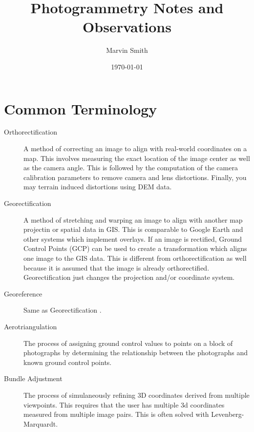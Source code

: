 \documentclass[12pt]{report}
\title{Photogrammetry Notes and Observations}
\author{Marvin Smith}
\date{\today}
\begin{document}
\maketitle

\tableofcontents
\clearpage

\section*{Common Terminology}

\begin{description}
\item[Orthorectification] A method of correcting an image to align with real-world coordinates on a map. 
                          This involves measuring the exact location of the image center as well as 
                          the camera angle.  This is followed by the computation of the camera calibration 
                          parameters to remove camera and lens distortions.  Finally, you may terrain
                          induced distortions using DEM data. 

\item[Georectification]   A method of stretching and warping an image to align with another map projectin or spatial 
                          data in GIS.  This is comparable to Google Earth and other systems which implement overlays. 
                          If an image is rectified, Ground Control Points (GCP) can be used to create a transformation which 
                          aligns one image to the GIS data.  This is different from orthorectification as well because
                          it is assumed that the image is already orthorectified. Georectification just changes the 
                          projection and/or coordinate system. 

\item[Georeference]       Same as Georectification  .

\item[Aerotriangulation]  The process of assigning ground control values to points on a block of photographs
                          by determining the relationship between the photographs and known ground control 
                          points.

\item[Bundle Adjustment]  The process of simulaneously refining 3D coordinates derived from multiple viewpoints.  
                          This requires that the user has multiple 3d coordinates measured from multiple image
                          pairs. This is often solved with Levenberg-Marquardt. 


\end{description}
\end{document}
